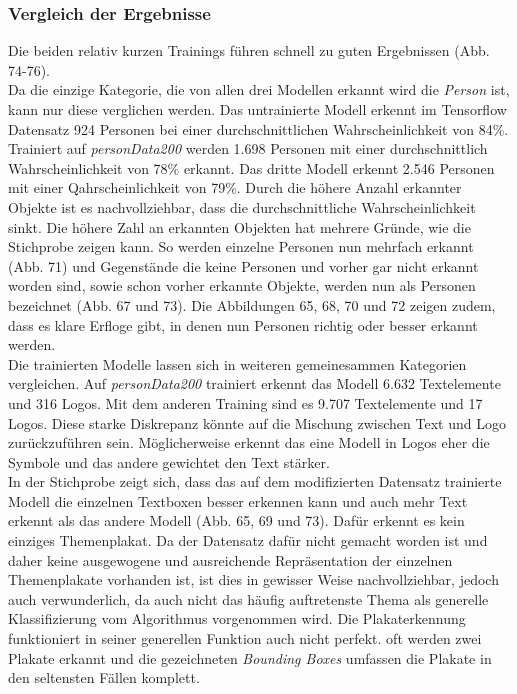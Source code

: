 \documentclass[a4paper,12pt,ngerman]{article}
\begin{document}
\subsubsection{Vergleich der Ergebnisse}

Die beiden relativ kurzen Trainings führen schnell zu guten Ergebnissen (Abb. 74-76). \\
Da die einzige Kategorie, die von allen drei Modellen erkannt wird die \textit{Person} ist, kann nur diese verglichen werden. Das untrainierte Modell erkennt im Tensorflow Datensatz 924 Personen bei einer durchschnittlichen Wahrscheinlichkeit von 84\%. Trainiert auf \textit{personData200} werden 1.698 Personen mit einer durchschnittlich Wahrscheinlichkeit von 78\% erkannt. Das dritte Modell erkennt 2.546 Personen mit einer Qahrscheinlichkeit von 79\%. Durch die höhere Anzahl erkannter Objekte ist es nachvollziehbar, dass die durchschnittliche Wahrscheinlichkeit sinkt. Die höhere Zahl an erkannten Objekten hat mehrere Gründe, wie die Stichprobe zeigen kann. So werden einzelne Personen nun mehrfach erkannt (Abb. 71) und Gegenstände die keine Personen und vorher gar nicht erkannt worden sind, sowie schon vorher erkannte Objekte, werden nun als Personen bezeichnet (Abb. 67 und 73). Die Abbildungen 65, 68, 70 und 72 zeigen zudem, dass es klare Erfloge gibt, in denen nun Personen richtig oder besser erkannt werden. \\
Die trainierten Modelle lassen sich in weiteren gemeinesammen Kategorien vergleichen. Auf \textit{personData200} trainiert erkennt das Modell 6.632 Textelemente und 316 Logos. Mit dem anderen Training sind es 9.707 Textelemente und 17 Logos. Diese starke Diskrepanz könnte auf die Mischung zwischen Text und Logo zurückzuführen sein. Möglicherweise erkennt das eine Modell in Logos eher die Symbole und das andere gewichtet den Text stärker. \\
In der Stichprobe zeigt sich, dass das auf dem modifizierten Datensatz trainierte Modell die einzelnen Textboxen besser erkennen kann und auch mehr Text erkennt als das andere Modell (Abb. 65, 69 und 73). Dafür erkennt es kein einziges Themenplakat. Da der Datensatz dafür nicht gemacht worden ist und daher keine ausgewogene und ausreichende Repräsentation der einzelnen Themenplakate vorhanden ist, ist dies in gewisser Weise nachvollziehbar, jedoch auch verwunderlich, da auch nicht das häufig auftretenste Thema als generelle Klassifizierung vom Algorithmus vorgenommen wird. Die Plakaterkennung funktioniert in seiner generellen Funktion auch nicht perfekt. oft werden zwei Plakate erkannt und die gezeichneten \textit{Bounding Boxes} umfassen die Plakate in den seltensten Fällen komplett. \\
\end{document}
